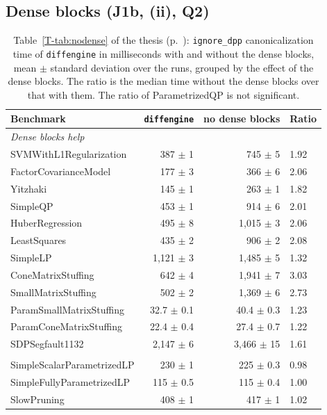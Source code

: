 \documentclass[letterpaper,12pt]{article}
\newcommand{\tpage}[1]{p.~\pageref{T-#1}}
\begin{document}
\subsection{Dense blocks (J1b, (ii), Q2)}

\begin{table}[htbp]
\centering
\caption{Table~\ref{T-tab:nodense} of the thesis (\tpage{tab:nodense}): \texttt{ignore\_dpp}
canonicalization time of \texttt{diffengine} in milliseconds with and without the dense blocks,
mean $\pm$ standard deviation over the runs, grouped by the effect of the dense blocks. The ratio
is the median time without the dense blocks over that with them. The ratio of ParametrizedQP is not
significant.}\label{tab:sup-nodense}
{\small
\begin{tabular}{l rr l}
\toprule
Benchmark & \texttt{diffengine} & no dense blocks & Ratio \\
\midrule
\multicolumn{4}{l}{\textit{Dense blocks help}} \\
SVMWithL1Regularization & 387 $\pm$ 1 & 745 $\pm$ 5 & 1.92 \\
FactorCovarianceModel & 177 $\pm$ 3 & 366 $\pm$ 6 & 2.06 \\
Yitzhaki & 145 $\pm$ 1 & 263 $\pm$ 1 & 1.82 \\
SimpleQP & 453 $\pm$ 1 & 914 $\pm$ 6 & 2.01 \\
HuberRegression & 495 $\pm$ 8 & 1{,}015 $\pm$ 3 & 2.06 \\
LeastSquares & 435 $\pm$ 2 & 906 $\pm$ 2 & 2.08 \\
SimpleLP & 1{,}121 $\pm$ 3 & 1{,}485 $\pm$ 5 & 1.32 \\
ConeMatrixStuffing & 642 $\pm$ 4 & 1{,}941 $\pm$ 7 & 3.03 \\
SmallMatrixStuffing & 502 $\pm$ 2 & 1{,}369 $\pm$ 6 & 2.73 \\
ParamSmallMatrixStuffing & 32.7 $\pm$ 0.1 & 40.4 $\pm$ 0.3 & 1.23 \\
ParamConeMatrixStuffing & 22.4 $\pm$ 0.4 & 27.4 $\pm$ 0.7 & 1.22 \\
SDPSegfault1132 & 2{,}147 $\pm$ 6 & 3{,}466 $\pm$ 15 & 1.61 \\
\addlinespace
\multicolumn{4}{l}{\textit{Little effect}} \\
SimpleScalarParametrizedLP & 230 $\pm$ 1 & 225 $\pm$ 0.3 & 0.98 \\
SimpleFullyParametrizedLP & 115 $\pm$ 0.5 & 115 $\pm$ 0.4 & 1.00 \\
SlowPruning & 408 $\pm$ 1 & 417 $\pm$ 1 & 1.02 \\

\end{tabular}}
\end{table}
\end{document}
